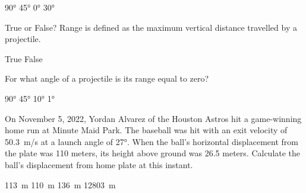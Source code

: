 \documentclass[../main-physics-workbook.tex]{subfiles}
\begin{document}
\begin{questions}
\begin{randomizechoices}
    \correctchoice \ang{90}
    \choice \ang{45}
    \choice \ang{0}
    \choice \ang{30}
\end{randomizechoices}

\question
True or False? Range is defined as the maximum vertical distance travelled by a projectile. 

\begin{choices}
    \choice True
    \correctchoice False
\end{choices}

\question
For what angle of a projectile is its range equal to zero?

\begin{randomizechoices}
    \correctchoice \ang{90}
    \choice \ang{45}
    \choice \ang{10}
    \choice \ang{1}
\end{randomizechoices}

\clearpage
\question
On November 5, 2022, Yordan Alvarez of the Houston Astros hit a game-winning home run at Minute Maid Park. The baseball was hit with an exit velocity of \SI{50.3}{m/s} at a launch angle of \ang{27}. When the ball's horizontal displacement from the plate was 110 meters, its height above ground was 26.5 meters. Calculate the ball's displacement from home plate at this instant.

\vspace{1em}

\begin{minipage}{6cm}
    \centering 
    \begin{randomizechoices}
        \correctchoice \SI{113}{m}
        \choice \SI{110}{m}
        \choice \SI{136}{m}
        \choice \SI{12803}{m}
    \end{randomizechoices}
\end{minipage}%
\begin{minipage}{6cm}
    \centering 
    \begin{center}
    \end{center}    
\end{minipage}%


\end{questions}
\end{document}
